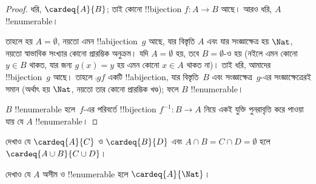 \documentclass[../../../include/open-logic-section]{subfiles}
\begin{document}
\begin{proof}
ধরি, $\cardeq{A}{B}$; তাই কোনো !!{bijection} $f \colon A
\to B$ আছে। আরও ধরি, $A$ !!{enumerable}।

{
  তাহলে হয় $A  = \emptyset$, নয়তো এমন !!a{bijection}~$g$ আছে, যার বিস্তৃতি $A$ এবং যার সংজ্ঞাক্ষেত্র হয় $\Nat$, নয়তো স্বাভাবিক সংখ্যার কোনো প্রারম্ভিক অনুক্রম। যদি $A = \emptyset$ হয়, তবে $B =
  \emptyset$-ও হয় (নইলে এমন কোনো~$y \in B$ থাকত, যার জন্য $g(x) = y$ হয় এমন কোনো $x
  \in A$ থাকত না)। তাই ধরি, আমাদের !!{bijection}~$g$ আছে। তাহলে $\comp{g}{f}$ একটি !!a{bijection}, যার বিস্তৃতি~$B$ এবং সংজ্ঞাক্ষেত্র~$g$-এর সংজ্ঞাক্ষেত্রেরই সমান (অর্থাৎ হয় $\Nat$, নয়তো তার কোনো প্রারম্ভিক খণ্ড); ফলে $B$ !!{enumerable}।}

$B$ !!{enumerable} হলে~$f$-এর পরিবর্তে !!{bijection} $f^{-1}\colon B \to A$ নিয়ে একই যুক্তি পুনরাবৃত্তি করে পাওয়া যায় যে $A$ !!{enumerable}।
\end{proof}

\begin{prob}
দেখাও যে $\cardeq{A}{C}$ ও $\cardeq{B}{D}$ এবং $A \cap B =
C \cap D = \emptyset$ হলে $\cardeq{A \cup B}{C \cup D}$।
\end{prob}

\begin{prob}
দেখাও যে $A$ অসীম ও !!{enumerable} হলে $\cardeq{A}{\Nat}$।
\end{prob}
\end{document}
